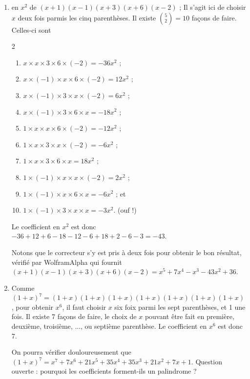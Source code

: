 {\begin{enumerate}
		On pourra vérifier que $(x+3)(x-4)(x-8) = x^3 -9x^2-4x+96$.
		\item
		en $x^2$ de $(x+1)(x-1)(x+3)(x+6)(x-2)$ ;
		Il s'agit ici de choisir $x$ deux fois parmis les cinq parenthèses.
		Il existe ${5 \choose 2} = 10$ façons de faire. Celles-ci sont
		\begin{multicols}{2}
		\begin{enumerate}[label=Produit \arabic* :]
			\item
			$x\times x \times 3\times6\times(-2) = -36x^2$ ;
			\item
			$x\times(-1)\times x \times6\times(-2) = 12x^2$ ;
			\item
			$x\times(-1)\times3\times x\times(-2) = 6x^2$ ;
			\item
			$x\times(-1)\times3\times6\times x = -18x^2$ ;
			\item
			$1\times x\times x \times 6\times(-2) = -12x^2$ ;
			\item
			$1\times x \times 3 \times x \times(-2) = -6x^2$ ;
			\item
			$1\times x \times 3 \times6\times x = 18x^2$ ;
			\item
			$1\times(-1)\times x \times x \times (-2) = 2x^2$ ;
			\item
			$1\times(-1)\times x \times6\times x = -6x^2$ ; et
			\item
			$1\times(-1)\times3\times x \times x = -3x^2$. (ouf !)
		\end{enumerate}
		\end{multicols}
		Le coefficient en $x^2$ est donc $-36+12+6-18-12-6+18+2-6-3 = -43$. 
		
		Notons que le correcteur s'y est pris à deux fois pour obtenir le bon résultat, vérifié par WolframAlpha qui fournit $(x+1)(x-1)(x+3)(x+6)(x-2) = x^5 +7x^4-x^3 -43x^2 +36$.
		\item
		Comme $(1+x)^7 = (1+x)(1+x)(1+x)(1+x)(1+x)(1+x)(1+x)$, pour obtenir $x^6$, il faut choisir $x$ six foix parmi les sept parenthèses, et 1 une fois.
		Il existe 7 façons de faire, le choix de $x$ pouvant être fait en première, deuxième, troisième, ..., ou septième parenthèse.
		Le coefficient en $x^6$ est donc 7.
		
		On pourra vérifier douloureusement que $(1+x)^7 = x^7 +7x^6 + 21x^5 + 35x^4 + 35x^3 + 21x^2 + 7x + 1$.
		Question ouverte : pourquoi les coefficients forment-ils un palindrome ?
	\end{enumerate}
}


